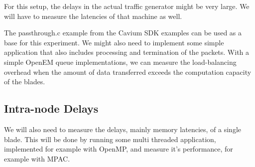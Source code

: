 For this setup, the delays in the actual traffic generator might be very large. We will have to measure the latencies of that machine as well.

The passthrough.c example from the Cavium SDK examples can be used as a base for this experiment. We might also need to implement some simple application that also includes processing and termination of the packets. With a simple OpenEM queue implementations, we can measure the load-balancing overhead when the amount of data transferred exceeds the computation capacity of the blades.

\subsection{Intra-node Delays}
We will also need to measure the delays, mainly memory latencies, of a single blade. This will be done by running some multi threaded application, implemented for example with OpenMP, and measure it's performance, for example with MPAC.

